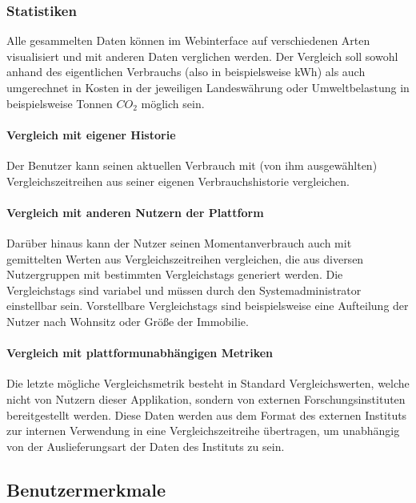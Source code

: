 \subsubsection{Statistiken}

Alle gesammelten Daten können im Webinterface auf verschiedenen Arten visualisiert
und mit anderen Daten verglichen werden.
Der Vergleich soll sowohl anhand des eigentlichen Verbrauchs (also in beispielsweise kWh)
als auch umgerechnet in Kosten in der jeweiligen Landeswährung oder Umweltbelastung in beispielsweise Tonnen $CO_2$
möglich sein.

\paragraph{Vergleich mit eigener Historie}

Der Benutzer kann seinen aktuellen Verbrauch mit (von ihm ausgewählten) Vergleichszeitreihen aus seiner
eigenen Verbrauchshistorie vergleichen.


\paragraph{Vergleich mit anderen Nutzern der Plattform}
Darüber hinaus kann der Nutzer seinen Momentanverbrauch auch mit gemittelten Werten aus Vergleichszeitreihen vergleichen,
die aus diversen Nutzergruppen mit bestimmten Vergleichstags generiert werden.
Die Vergleichstags sind variabel und müssen durch den Systemadministrator einstellbar sein.
Vorstellbare Vergleichstags sind beispielsweise eine Aufteilung der Nutzer nach Wohnsitz oder Größe der Immobilie.


\paragraph{Vergleich mit plattformunabhängigen Metriken}
\label{par:vgl_plattformunabhaengig}

Die letzte mögliche Vergleichsmetrik besteht in Standard Vergleichswerten, welche nicht von Nutzern dieser Applikation,
sondern von externen Forschungsinstituten bereitgestellt werden.
Diese Daten werden aus dem Format des externen Instituts zur internen Verwendung in eine Vergleichszeitreihe übertragen,
um unabhängig von der Auslieferungsart der Daten des Instituts zu sein.

\subsection{Benutzermerkmale}\label{subsec:desc_user}

